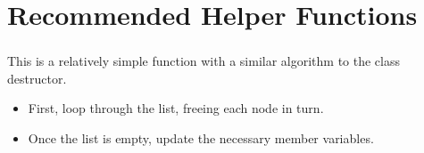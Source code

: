 \section{Recommended Helper Functions}
\label{section:rec_helper}


\subsubsection{}
This is a relatively simple function with a similar algorithm to the
class destructor.

\begin{itemize}
	\item First, loop through the list, freeing each node in turn.
	\item Once the list is empty, update the necessary member variables.
\end{itemize}
